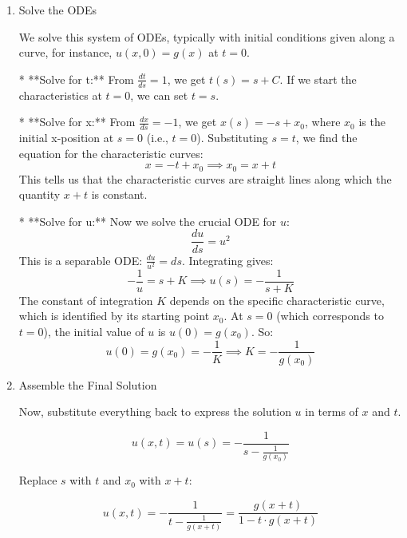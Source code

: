 \documentclass[12pt,a4paper]{report}
\begin{document}
{\begin{description}
\begin{itemize}
\begin{itemize}
\begin{enumerate}
\[ \frac{dx}{ds} = a, \quad \frac{dt}{ds} = b, \quad \frac{du}{ds} = c \]

For your equation, \(u_t - u_x = u^2\), we can write it as \((-1)u_x + (1)u_t = u^2\). So, \(a=-1\), \(b=1\), and \(c=u^2\). The characteristic equations are:

\begin{enumerate}
\item  \(\frac{dt}{ds} = 1\)
\item  \(\frac{dx}{ds} = -1\)
\item \(\frac{du}{ds} = u^2\)

\end{enumerate}

\item  Solve the ODEs

We solve this system of ODEs, typically with initial conditions given along a curve, for instance, \(u(x,0) = g(x)\) at \(t=0\).

*   **Solve for t:** From \(\frac{dt}{ds} = 1\), we get \(t(s) = s + C\). If we start the characteristics at \(t=0\), we can set \(t=s\).

*   **Solve for x:** From \(\frac{dx}{ds} = -1\), we get \(x(s) = -s + x_0\), where \(x_0\) is the initial x-position at \(s=0\) (i.e., \(t=0\)). Substituting \(s=t\), we find the equation for the characteristic curves:
    \[ x = -t + x_0 \implies x_0 = x+t \]
    This tells us that the characteristic curves are straight lines along which the quantity \(x+t\) is constant.

*   **Solve for u:** Now we solve the crucial ODE for \(u\):
    \[ \frac{du}{ds} = u^2 \]
    This is a separable ODE: \(\frac{du}{u^2} = ds\). Integrating gives:
    \[ -\frac{1}{u} = s + K \implies u(s) = -\frac{1}{s+K} \]
    The constant of integration \(K\) depends on the specific characteristic curve, which is identified by its starting point \(x_0\). At \(s=0\) (which corresponds to \(t=0\)), the initial value of \(u\) is \(u(0) = g(x_0)\). So:
    \[ u(0) = g(x_0) = -\frac{1}{K} \implies K = -\frac{1}{g(x_0)} \]

\item Assemble the Final Solution

Now, substitute everything back to express the solution \(u\) in terms of \(x\) and \(t\).

\[ u(x,t) = u(s) = -\frac{1}{s - \frac{1}{g(x_0)}} \]

Replace \(s\) with \(t\) and \(x_0\) with \(x+t\):

\[ u(x,t) = -\frac{1}{t - \frac{1}{g(x+t)}} = \frac{g(x+t)}{1 - t \cdot g(x+t)} \]


\end{enumerate}
\end{itemize}
\end{itemize}
\end{description}}
\end{document}
